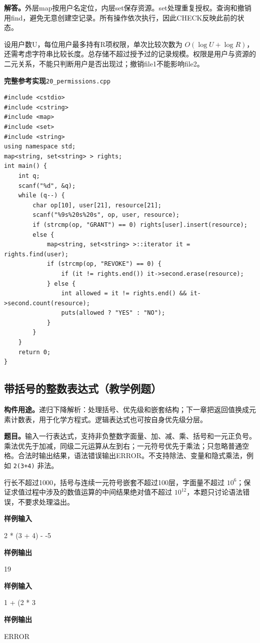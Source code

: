 \documentclass[UTF8,11pt,a4paper,fontset=none]{ctexart}
\begin{document}
\noindent\textbf{解答。}外层map按用户名定位，内层set保存资源。set处理重复授权。查询和撤销用find，避免无意创建空记录。所有操作依次执行，因此CHECK反映此前的状态。

设用户数U，每位用户最多持有R项权限，单次比较次数为 $O(\log U+\log R)$，还需考虑字符串比较长度。总存储不超过授予过的记录规模。权限是用户与资源的二元关系，不能只判断用户是否出现过；撤销file1不能影响file2。
\par\noindent\begin{minipage}{\linewidth}
\textbf{完整参考实现}\quad\texttt{20\_permissions.cpp}
\begin{lstlisting}
#include <cstdio>
#include <cstring>
#include <map>
#include <set>
#include <string>
using namespace std;
map<string, set<string> > rights;
int main() {
    int q;
    scanf("%d", &q);
    while (q--) {
        char op[10], user[21], resource[21];
        scanf("%9s%20s%20s", op, user, resource);
        if (strcmp(op, "GRANT") == 0) rights[user].insert(resource);
        else {
            map<string, set<string> >::iterator it = rights.find(user);
            if (strcmp(op, "REVOKE") == 0) {
                if (it != rights.end()) it->second.erase(resource);
            } else {
                int allowed = it != rights.end() && it->second.count(resource);
                puts(allowed ? "YES" : "NO");
            }
        }
    }
    return 0;
}
\end{lstlisting}
\end{minipage}\par


\subsection{带括号的整数表达式（教学例题）}
\noindent\textbf{构件用途。}递归下降解析：处理括号、优先级和嵌套结构；下一章把返回值换成元素计数表，用于化学方程式。逻辑表达式也可按自身优先级分层。


\noindent\textbf{题目。}输入一行表达式，支持非负整数字面量、加、减、乘、括号和一元正负号。乘法优先于加减，同级二元运算从左到右；一元符号优先于乘法；只忽略普通空格。合法时输出结果，语法错误输出ERROR。不支持除法、变量和隐式乘法，例如 \texttt{2(3+4)} 非法。

行长不超过1000，括号与连续一元符号嵌套不超过100层，字面量不超过 $10^6$；保证求值过程中涉及的数值运算的中间结果绝对值不超过 $10^{12}$，本题只讨论语法错误，不要求处理溢出。
\begin{tcolorbox}[samplebox,title={输入输出样例 1}]
\textbf{样例输入}
\begin{Sample}
2 * (3 + 4) - -5
\end{Sample}
\tcblower
\textbf{样例输出}
\begin{Sample}
19
\end{Sample}
\end{tcolorbox}
\begin{tcolorbox}[samplebox,title={输入输出样例 2}]
\textbf{样例输入}
\begin{Sample}
1 + (2 * 3
\end{Sample}
\tcblower
\textbf{样例输出}
\begin{Sample}
ERROR
\end{Sample}
\end{tcolorbox}
\end{document}
